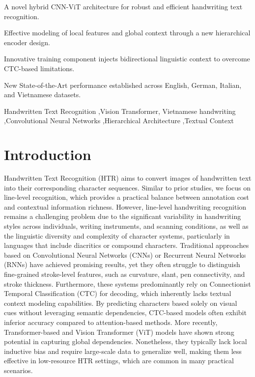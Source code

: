 \documentclass[final,5p,times]{elsarticle}
\begin{document}
\begin{frontmatter}
\begin{highlights}
\item  A novel hybrid CNN-ViT architecture for robust and efficient handwriting text recognition.
\item  Effective modeling of local features and global context through a new hierarchical encoder design.
\item Innovative training component injects bidirectional linguistic context to overcome CTC-based limitations.
\item New State-of-the-Art performance established across English, German, Italian, and Vietnamese datasets.
\end{highlights}

\begin{keyword}

Handwritten Text Recognition \sep Vision Transformer, Vietnamese handwriting \sep Convolutional Neural Networks \sep Hierarchical Architecture \sep Textual Context
\end{keyword}

\end{frontmatter}

\section{Introduction}
\label{sec1}
Handwritten Text Recognition (HTR) aims to convert images of handwritten text into their corresponding character sequences. Similar to prior studies, we focus on line-level recognition, which provides a practical balance between annotation cost and contextual information richness.
However, line-level handwriting recognition remains a challenging problem due to the significant variability in handwriting styles across individuals, writing instruments, and scanning conditions, as well as the linguistic diversity and complexity of character systems, particularly in languages that include diacritics or compound characters.
Traditional approaches based on Convolutional Neural Networks (CNNs) or Recurrent Neural Networks (RNNs) have achieved promising results, yet they often struggle to distinguish fine-grained stroke-level features, such as curvature, slant, pen connectivity, and stroke thickness. Furthermore, these systems predominantly rely on Connectionist Temporal Classification (CTC) for decoding, which inherently lacks textual context modeling capabilities. By predicting characters based solely on visual cues without leveraging semantic dependencies, CTC-based models often exhibit inferior accuracy compared to attention-based methods. More recently, Transformer-based and Vision Transformer (ViT) models have shown strong potential in capturing global dependencies. Nonetheless, they typically lack local inductive bias and require large-scale data to generalize well, making them less effective in low-resource HTR settings, which are common in many practical scenarios.
\end{document}
